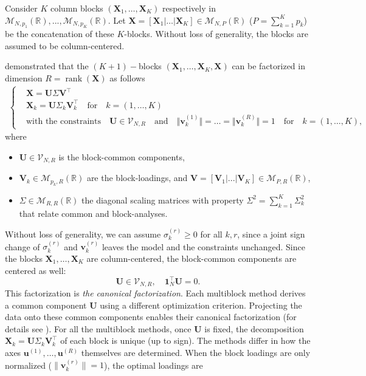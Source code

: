 \documentclass[11pt]{article}
\DeclareMathOperator{\rank}{rank}
\newcommand{\X}{\mathbf{X}}
\newcommand{\U}{\mathbf{U}}
\newcommand{\V}{\mathbf{V}}
\newcommand{\uu}{\mathbf{u}}
\newcommand{\vv}{\mathbf{v}}
\newcommand{\one}{\mathbf{1}}
\newcommand{\Stiefel}[2]{\mathcal V_{#1,#2}}
\begin{document}
Consider $K$ column blocks  $(\textbf{X}_1,\ldots,\textbf{X}_K)$ respectively in $\mathcal M_{N,p_1}(\mathbb R),...,\mathcal M_{N,p_K}(\mathbb R)$. Let $\textbf{X}=[\textbf{X}_1|\ldots|\textbf{X}_K]\in \mathcal M_{N,P}(\mathbb R)$ ($P=\sum_{k=1}^K p_k$) be the concatenation of these $K$-blocks. Without loss of generality, the blocks are assumed to be column-centered.

\cite{bougeard2024} demonstrated that the $(K+1)-$blocks $(\textbf{X}_1,\ldots,\textbf{X}_K,\textbf{X})$ can be factorized in dimension $R=\rank(\textbf{X})$ as follows  
\begin{align}
  \left\{
	\begin{array}{ll}
		&\X   = \U \Sigma \V^\intercal   \\
		&\X_k = \U \Sigma_k \V_k^\intercal \quad \textrm{for} \quad k=(1, \dots, K)    \\	
		&\textrm{with the constraints} \quad \U\in \Stiefel{N}{R} \quad \textrm{and} \quad \Vert\vv_k^{(1)}\Vert=\ldots=\Vert\vv_k^{(R)}\Vert=1 \quad \textrm{for} \quad k=(1, \dots, K), 
	\end{array}
	\right. \label{Cano_Facto}
\end{align}
where
\begin{itemize}
	\item $\U\in \Stiefel{N}{R}$ is the block-common components,
	\item $\V_k \in \mathcal M_{p_k,R}(\mathbb R)$ are the  block-loadings, and $\V=[\V_1|...|\V_K] \in \mathcal M_{P,R}(\mathbb R)$,
  \item $\Sigma\in \mathcal M_{R,R}(\mathbb R)$ the diagonal scaling matrices with property $\Sigma^2 = \sum_{k=1}^K \Sigma_k^2$ that relate common and block-analyses.
\end{itemize}
Without loss of generality, we can assume $\sigma_k^{(r)}\geq 0$ for all $k,r$, since a joint sign change of $\sigma_k^{(r)}$ and $\vv_k^{(r)}$ leaves the model and the constraints unchanged. Since the blocks $\X_1,\ldots,\X_K$ are column-centered, the block-common components are centered as well:
$$\U\in\Stiefel{N}{R}, \quad \one_N^\intercal\U=0.$$
This factorization is \textit{the canonical factorization}. Each multiblock method derives a common component $\U$ using a different optimization criterion. Projecting the data onto these common components enables their canonical factorization (for details see \cite{bougeard2024}). For all the multiblock methods, once $\U$ is fixed, the decomposition $\X_k=\U\Sigma_k\V_k^\intercal$ of each block is unique (up to sign). The methods differ in how the axes $\uu^{(1)},\ldots,\uu^{(R)}$ themselves are determined. When the block loadings are only normalized ($\|\vv_k^{(r)}\|=1$), the optimal loadings are
\end{document}
